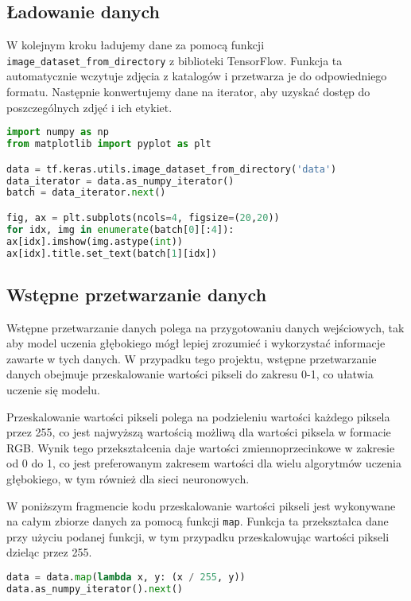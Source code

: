 \subsection{Ładowanie danych}
W kolejnym kroku ładujemy dane za pomocą funkcji \texttt{image\_dataset\_from\_directory} z biblioteki TensorFlow. Funkcja ta automatycznie wczytuje zdjęcia z katalogów i przetwarza je do odpowiedniego formatu. Następnie konwertujemy dane na iterator, aby uzyskać dostęp do poszczególnych zdjęć i ich etykiet.

\begin{lstlisting}[language=Python]
import numpy as np
from matplotlib import pyplot as plt

data = tf.keras.utils.image_dataset_from_directory('data')
data_iterator = data.as_numpy_iterator()
batch = data_iterator.next()

fig, ax = plt.subplots(ncols=4, figsize=(20,20))
for idx, img in enumerate(batch[0][:4]):
ax[idx].imshow(img.astype(int))
ax[idx].title.set_text(batch[1][idx])
\end{lstlisting}

\subsection{Wstępne przetwarzanie danych}
Wstępne przetwarzanie danych polega na przygotowaniu danych wejściowych, tak aby model uczenia głębokiego mógł lepiej zrozumieć i wykorzystać informacje zawarte w tych danych. W przypadku tego projektu, wstępne przetwarzanie danych obejmuje przeskalowanie wartości pikseli do zakresu 0-1, co ułatwia uczenie się modelu.

Przeskalowanie wartości pikseli polega na podzieleniu wartości każdego piksela przez 255, co jest najwyższą wartością możliwą dla wartości piksela w formacie RGB. Wynik tego przekształcenia daje wartości zmiennoprzecinkowe w zakresie od 0 do 1, co jest preferowanym zakresem wartości dla wielu algorytmów uczenia głębokiego, w tym również dla sieci neuronowych.

W poniższym fragmencie kodu przeskalowanie wartości pikseli jest wykonywane na całym zbiorze danych za pomocą funkcji \texttt{map}. Funkcja ta przekształca dane przy użyciu podanej funkcji, w tym przypadku przeskalowując wartości pikseli dzieląc przez 255.

\begin{lstlisting}[language=Python]
data = data.map(lambda x, y: (x / 255, y))
data.as_numpy_iterator().next()
\end{lstlisting}

